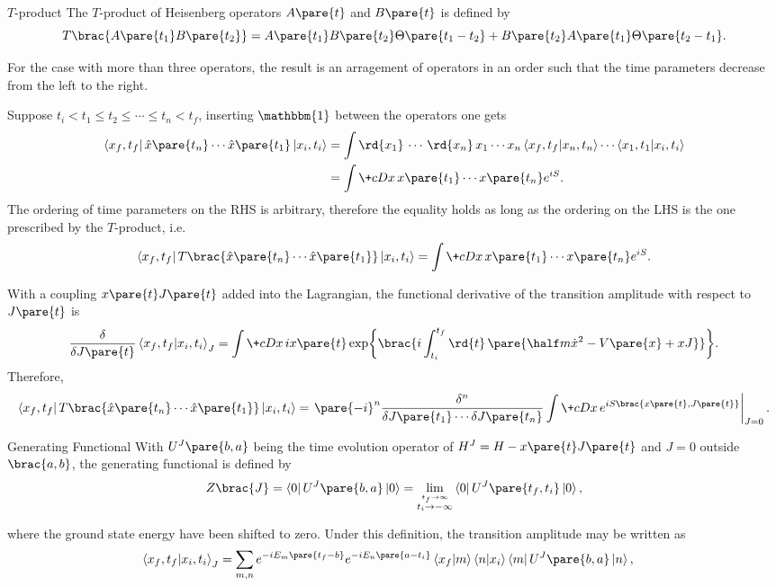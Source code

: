 \documentclass[hidelinks]{article}
\begin{document}
\begin{termdef}{$T$-product}
    The $T$-product of Heisenberg operators $A\pare{t}$ and $B\pare{t}$ is defined by
    \[ T\brac{A\pare{t_1}B\pare{t_2}} = A\pare{t_1}B\pare{t_2}\Theta\pare{t_1 - t_2} + B\pare{t_2}A\pare{t_1}\Theta\pare{t_2 - t_1}. \]
\end{termdef}
For the case with more than three operators, the result is an arragement of operators in an order such that the time parameters decrease from the left to the right.
\par
Suppose $t_i < t_1\le t_2\le \cdots\le t_n<t_f$, inserting $\mathbbm{1}$ between the operators one gets
\begin{align*}
    \bra{x_f,t_f}\hat x\pare{t_n}\cdots \hat x\pare{t_1}\ket{x_i,t_i} & = \int \rd{x_1}\,\cdots \,\rd{x_n}\, x_1\cdots x_n \bra{x_f,t_f}\ket{x_n,t_n}\cdots\bra{x_1,t_1}\ket{x_i,t_i} \\
    &= \int \+cD x\,x\pare{t_1}\cdots x\pare{t_n}e^{iS}.
\end{align*}
The ordering of time parameters on the RHS is arbitrary, therefore the equality holds as long as the ordering on the LHS is the one prescribed by the $T$-product, i.e.
\[ \bra{x_f,t_f}T\brac{\hat x\pare{t_n}\cdots \hat x\pare{t_1}}\ket{x_i,t_i} = \int \+cD x\,x\pare{t_1}\cdots x\pare{t_n}e^{iS}. \]
\par
With a coupling $x\pare{t}J\pare{t}$ added into the Lagrangian, the functional derivative of the transition amplitude with respect to $J\pare{t}$ is
\[ \frac{\delta}{\delta J\pare{t}}\bra{x_f,t_f}\ket{x_i,t_i}_J = \int \+cD{x}\, ix\pare{t}\exp\brac{i\int_{t_i}^{t_f}\rd{t}\,\pare{\half m\dot{x}^2 - V\pare{x} + xJ}}. \]
Therefore,
\[ \bra{x_f,t_f}T\brac{\hat x\pare{t_n}\cdots \hat x\pare{t_1}}\ket{x_i,t_i} = \left.\pare{-i}^n \frac{\delta^n}{\delta J\pare{t_1} \cdots \delta J\pare{t_n}}\int \+cD x\, e^{iS\brac{x\pare{t},J\pare{t}}}\right\vert_{J=0}. \]
\begin{termdef}{Generating Functional}
    With $U^J\pare{b,a}$ being the time evolution operator of $H^J = H - x\pare{t}J\pare{t}$ and $J = 0$ outside $\brac{a,b}$, the generating functional is defined by
    \[ Z\brac{J} = \bra{0}U^J\pare{b,a}\ket{0} = \lim_{\stackrel{t_f \rightarrow \infty}{t_i \rightarrow -\infty}}\bra{0}U^J\pare{t_f,t_i}\ket{0}, \]
\end{termdef}
where the ground state energy have been shifted to zero. Under this definition, the transition amplitude may be written as
\begin{align*}
    \bra{x_f,t_f}\ket{x_i,t_i}_J &= \sum_{m,n} e^{-iE_m\pare{t_f - b}}e^{-iE_n\pare{a-t_i}}\bra{x_f}\ket{m}\bra{n}\ket{x_i}\bra{m}U^J\pare{b,a}\ket{n},
\end{align*}
\end{document}
